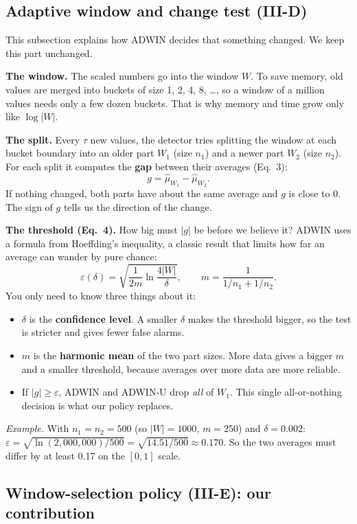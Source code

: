 \documentclass[11pt,a4paper]{article}
\begin{document}
\subsection{Adaptive window and change test (III-D)}

This subsection explains how ADWIN decides that something changed. We keep this part unchanged.

\textbf{The window.} The scaled numbers go into the window $W$. To save memory, old values are merged into buckets of size 1, 2, 4, 8, \dots, so a window of a million values needs only a few dozen buckets. That is why memory and time grow only like $\log|W|$.

\textbf{The split.} Every $\tau$ new values, the detector tries splitting the window at each bucket boundary into an older part $W_1$ (size $n_1$) and a newer part $W_2$ (size $n_2$). For each split it computes the \textbf{gap} between their averages (Eq.~3):
\[
g=\hat\mu_{W_1}-\hat\mu_{W_2}.
\]
If nothing changed, both parts have about the same average and $g$ is close to 0. The sign of $g$ tells us the direction of the change.

\textbf{The threshold (Eq.~4).} How big must $|g|$ be before we believe it? ADWIN uses a formula from Hoeffding's inequality, a classic result that limits how far an average can wander by pure chance:
\[
\varepsilon(\delta)=\sqrt{\frac{1}{2m}\ln\frac{4|W|}{\delta}},\qquad m=\frac{1}{1/n_1+1/n_2}.
\]
You only need to know three things about it:
\begin{itemize}
\item $\delta$ is the \textbf{confidence level}. A smaller $\delta$ makes the threshold bigger, so the test is stricter and gives fewer false alarms.
\item $m$ is the \textbf{harmonic mean} of the two part sizes. More data gives a bigger $m$ and a smaller threshold, because averages over more data are more reliable.
\item If $|g|\ge\varepsilon$, ADWIN and ADWIN-U drop \emph{all} of $W_1$. This single all-or-nothing decision is what our policy replaces.
\end{itemize}

\emph{Example.} With $n_1=n_2=500$ (so $|W|=1000$, $m=250$) and $\delta=0.002$: $\varepsilon=\sqrt{\ln(2{,}000{,}000)/500}=\sqrt{14.51/500}\approx0.170$. So the two averages must differ by at least 0.17 on the $[0,1]$ scale.

\subsection{Window-selection policy (III-E): our contribution}
\end{document}
